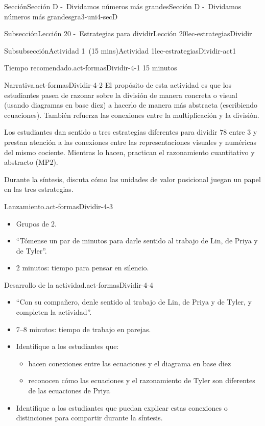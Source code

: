 \documentclass[oneside,10pt,]{article}
\begin{document}
\begin{sectionptx}{Sección}{Sección D -~Dividamos números más grandes}{}{Sección D -~Dividamos números más grandes}{}{}{gra3-uni4-secD}
\begin{subsectionptx}{Subsección}{Lección 20 -~Estrategias para dividir}{}{Lección 20}{}{}{lec-estrategiasDividir}
\begin{subsubsectionptx}{Subsubsección}{Actividad 1~(15 mins)}{}{Actividad 1}{}{}{lec-estrategiasDividir-act1}
\par
\begin{paragraphs}{Tiempo recomendado.}{act-formasDividir-4-1}%
15 minutos%
\end{paragraphs}%
\begin{paragraphs}{Narrativa.}{act-formasDividir-4-2}%
El propósito de esta actividad es que los estudiantes pasen de razonar sobre la división de manera concreta o visual (usando diagramas en base diez) a hacerlo de manera más abstracta (escribiendo ecuaciones). También refuerza las conexiones entre la multiplicación y la división.%
\par
Los estudiantes dan sentido a tres estrategias diferentes para dividir \(78\) entre \(3\) y prestan atención a las conexiones entre las representaciones visuales y numéricas del mismo cociente. Mientras lo hacen, practican el razonamiento cuantitativo y abstracto (MP2).%
\par
Durante la síntesis, discuta cómo las unidades de valor posicional juegan un papel en las tres estrategias.%
\end{paragraphs}%
\begin{paragraphs}{Lanzamiento.}{act-formasDividir-4-3}%
%
\begin{itemize}[label=\textbullet]
\item{}Grupos de 2.%
\item{}``Tómense un par de minutos para darle sentido al trabajo de Lin, de Priya y de Tyler''.%
\item{}2 minutos: tiempo para pensar en silencio.%
\end{itemize}
\end{paragraphs}%
\begin{paragraphs}{Desarrollo de la actividad.}{act-formasDividir-4-4}%
%
\begin{itemize}[label=\textbullet]
\item{}``Con su compañero, denle sentido al trabajo de Lin, de Priya y de Tyler, y completen la actividad''.%
\item{}7–8 minutos: tiempo de trabajo en parejas.%
\item{}Identifique a los estudiantes que:%
%
\begin{itemize}[label=$\circ$]
\item{}hacen conexiones entre las ecuaciones y el diagrama en base diez%
\item{}reconocen cómo las ecuaciones y el razonamiento de Tyler son diferentes de las ecuaciones de Priya%
\end{itemize}
\item{}Identifique a los estudiantes que puedan explicar estas conexiones o distinciones para compartir durante la síntesis.%

\end{itemize}
\end{paragraphs}
\end{subsubsectionptx}
\end{subsectionptx}
\end{sectionptx}
\end{document}
